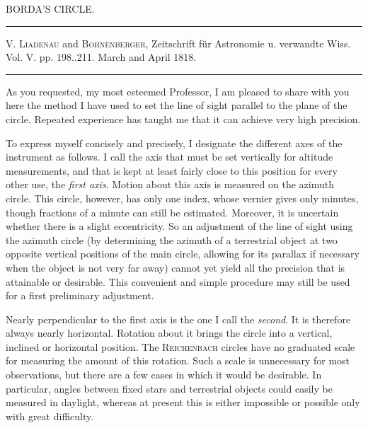 \clearpage{}\hypertarget{native-409-part-lower}{}\label{native-409-part-lower}
\begin{center}\large BORDA’S CIRCLE.\end{center}
\begin{center}\hrule\vspace{4pt}\fontsize{10}{12}\selectfont V. \textsc{Liadenau} and \textsc{Bohnenberger}, Zeitschrift für Astronomie u. verwandte Wiss.\\ Vol. V. pp. 198..211. March and April 1818.\par\vspace{4pt}\hrule\vspace{4pt}\end{center}
\par\indent As you requested, my most esteemed Professor, I am pleased to share with you here the method I have used to set the line of sight parallel to the plane of the circle. Repeated experience has taught me that it can achieve very high precision.

\par\indent To express myself concisely and precisely, I designate the different axes of the instrument as follows. I call the axis that must be set vertically for altitude measurements, and that is kept at least fairly close to this position for every other use, the \emph{first axis}. Motion about this axis is measured on the azimuth circle. This circle, however, has only one index, whose vernier gives only minutes, though fractions of a minute can still be estimated. Moreover, it is uncertain whether there is a slight eccentricity. So an adjustment of the line of sight using the azimuth circle (by determining the azimuth of a terrestrial object at two opposite vertical positions of the main circle, allowing for its parallax if necessary when the object is not very far away) cannot yet yield all the precision that is attainable or desirable. This convenient and simple procedure may still be used for a first preliminary adjustment.

\par\indent Nearly perpendicular to the first axis is the one I call the \emph{second}. It is therefore always nearly horizontal. Rotation about it brings the circle into a vertical, inclined or horizontal position. The \textsc{Reichenbach} circles have no graduated scale for measuring the amount of this rotation. Such a scale is unnecessary for most observations, but there are a few cases in which it would be desirable. In particular, angles between fixed stars and terrestrial objects could easily be measured in daylight, whereas at present this is either impossible or possible only with great difficulty.

